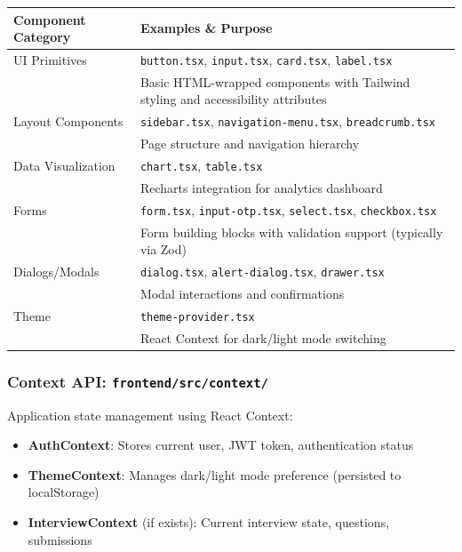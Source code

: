 \documentclass[12pt,a4paper,oneside]{article}
\newcommand{\fileref}[1]{\texttt{#1}}
\begin{document}
\begin{table}[H]
\centering
\small
\begin{tabular}{|p{3cm}|p{11cm}|}
\hline
\textbf{Component Category} & \textbf{Examples \& Purpose} \\
\hline
UI Primitives & \fileref{button.tsx}, \fileref{input.tsx}, \fileref{card.tsx}, \fileref{label.tsx} \\
& Basic HTML-wrapped components with Tailwind styling and accessibility attributes \\
\hline
Layout Components & \fileref{sidebar.tsx}, \fileref{navigation-menu.tsx}, \fileref{breadcrumb.tsx} \\
& Page structure and navigation hierarchy \\
\hline
Data Visualization & \fileref{chart.tsx}, \fileref{table.tsx} \\
& Recharts integration for analytics dashboard \\
\hline
Forms & \fileref{form.tsx}, \fileref{input-otp.tsx}, \fileref{select.tsx}, \fileref{checkbox.tsx} \\
& Form building blocks with validation support (typically via Zod) \\
\hline
Dialogs/Modals & \fileref{dialog.tsx}, \fileref{alert-dialog.tsx}, \fileref{drawer.tsx} \\
& Modal interactions and confirmations \\
\hline
Theme & \fileref{theme-provider.tsx} \\
& React Context for dark/light mode switching \\
\hline
\end{tabular}
\end{table}

\subsubsection{Context API: \fileref{frontend/src/context/}}

Application state management using React Context:

\begin{itemize}
    \item \textbf{AuthContext}: Stores current user, JWT token, authentication status
    \item \textbf{ThemeContext}: Manages dark/light mode preference (persisted to localStorage)
    \item \textbf{InterviewContext} (if exists): Current interview state, questions, submissions
\end{itemize}
\end{document}
